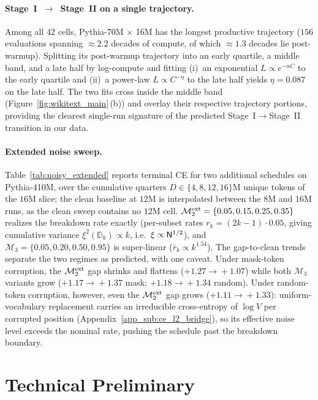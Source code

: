\documentclass[11pt]{article}
\theoremstyle{plain}
\begin{document}
\paragraph{Stage~I~$\to$~Stage~II on a single trajectory.} Among all $42$ cells, Pythia-70M$\,\times\,$16M has the longest productive trajectory ($156$ evaluations spanning $\approx\!2.2$ decades of compute, of which $\approx\!1.3$ decades lie post-warmup). Splitting its post-warmup trajectory into an early quartile, a middle band, and a late half by log-compute and fitting (i)~an exponential $L \propto e^{-\alpha C}$ to the early quartile and (ii)~a power-law $L\propto C^{-\eta}$ to the late half yields $\eta=0.087$ on the late half. The two fits cross inside the middle band (Figure~\ref{fig:wikitext_main}\,(b)) and overlay their respective trajectory portions, providing the clearest single-run signature of the predicted Stage~I$\to$Stage~II transition in our data.

\paragraph{Extended noise sweep.} Table~\ref{tab:noisy_extended} reports terminal CE for two additional schedules on Pythia-410M, over the cumulative quarters $D\in\{4, 8, 12, 16\}$M unique tokens of the $16$M slice; the clean baseline at $12$M is interpolated between the $8$M and $16$M runs, as the clean sweep contains no $12$M cell. $\mathcal{M}_2^{\rm ext}=\{0.05, 0.15, 0.25, 0.35\}$ realizes the breakdown rate exactly (per-subset rates $r_k = (2k-1)\cdot 0.05$, giving cumulative variance $\xi^2(\mathbb{D}_k)\propto k$, i.e.\ $\xi\propto{\sf N}^{1/2}$), and $\mathcal{M}_3=\{0.05, 0.20, 0.50, 0.95\}$ is super-linear ($\bar r_k\propto k^{1.54}$). The gap-to-clean trends separate the two regimes as predicted, with one caveat. Under mask-token corruption, the $\mathcal{M}_2^{\rm ext}$ gap shrinks and flattens ($+1.27\!\to\!+1.07$) while both $\mathcal{M}_3$ variants grow ($+1.17\!\to\!+1.37$ mask; $+1.18\!\to\!+1.34$ random). Under random-token corruption, however, even the $\mathcal{M}_2^{\rm ext}$ gap grows ($+1.11\!\to\!+1.33$): uniform-vocabulary replacement carries an irreducible cross-entropy of $\log V$ per corrupted position (Appendix~\ref{app_sub:ce_l2_bridge}), so its effective noise level exceeds the nominal rate, pushing the schedule past the breakdown boundary.

\newpage

\section{Technical Preliminary}\label{app:preli}
\end{document}
